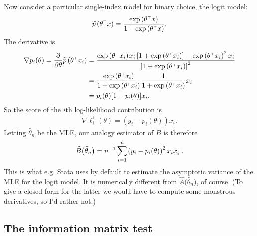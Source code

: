 \documentclass[11pt,letterpaper,reqno,oneside]{article}
\begin{document}
\begin{example}
	Now consider a particular single-index model for binary choice, the logit model:
	\begin{equation*}
		\widetilde{p}\left( \theta^{\scriptscriptstyle \top} x \right) 
		= \frac{ \exp\left( \theta^{\scriptscriptstyle \top} x \right) }
		{ 1 + \exp\left( \theta^{\scriptscriptstyle \top} x \right) } .
	\end{equation*}
	The derivative is
	\begin{align*}
		\nabla p_i(\theta)
		= \frac{\partial}{\partial \theta}
		\widetilde{p}\left( \theta^{\scriptscriptstyle \top} x_i \right) 
		={}& \frac{ \exp\left( \theta^{\scriptscriptstyle \top} x_i \right) x_i
		\left[ 1 + \exp\left( \theta^{\scriptscriptstyle \top} x_i \right) \right] 
		- \exp\left( \theta^{\scriptscriptstyle \top} x_i \right)^2 x_i }
		{ \left[ 1 + \exp\left( \theta^{\scriptscriptstyle \top} x_i \right) \right]^2 } 
		\\
		={}& \frac{ \exp\left( \theta^{\scriptscriptstyle \top} x_i \right) }
		{ 1 + \exp\left( \theta^{\scriptscriptstyle \top} x_i \right) }
		\frac{ 1 }
		{ 1 + \exp\left( \theta^{\scriptscriptstyle \top} x_i \right) }
		x_i
		\\
		={}& p_i(\theta) [ 1 - p_i(\theta) ] x_i .
	\end{align*}
	So the score of the $i$th log-likelihood contribution is
	\begin{gather*}
		\nabla \ell^1_i(\theta) 
		= \left( y_i - p_i(\theta) \right) x_i .
	\end{gather*}
	Letting $\widehat{\theta}_n$ be the MLE, our analogy estimator of $B$ is therefore
	\begin{gather*}
		\widehat{B}\bigl( \widehat{\theta}_n \bigr)
		= n^{-1} \sum_{i=1}^n \left( y_i - p_i(\theta) \right)^2
		x_i x_i^{\scriptscriptstyle \top} .
	\end{gather*}
	This is what e.g. Stata uses by default to estimate the asymptotic variance of the MLE for the logit model. It is numerically different from $\widehat{A}\bigl( \widehat{\theta}_n \bigr)$, of course. (To give a closed form for the latter we would have to compute some monstrous derivatives, so I'd rather not.)
\end{example}



\subsection{The information matrix test}
\label{sec:MLE:info_matrix_test}
\end{document}
